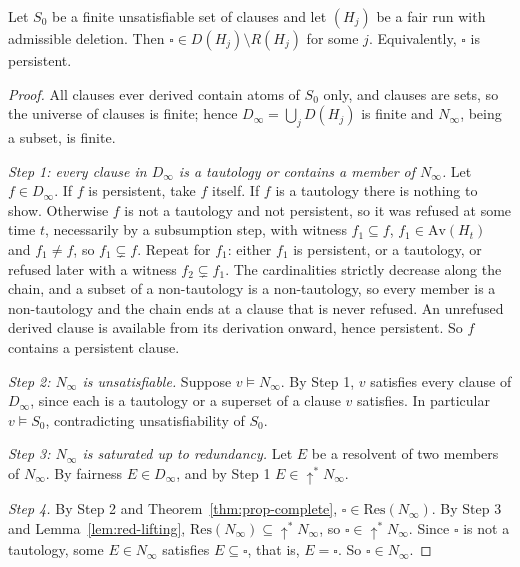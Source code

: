 \begin{theorem}
\label{thm:complete-deletion}
Let $S_0$ be a finite unsatisfiable set of clauses and let $(H_j)$ be a fair run with admissible deletion. Then $\square\in D(H_j)\setminus R(H_j)$ for some $j$. Equivalently, $\square$ is persistent.
\end{theorem}

\begin{proof}
All clauses ever derived contain atoms of $S_0$ only, and clauses are sets, so the universe of clauses is finite; hence $D_\infty=\bigcup_jD(H_j)$ is finite and $N_\infty$, being a subset, is finite.

\emph{Step 1: every clause in $D_\infty$ is a tautology or contains a member of $N_\infty$.} Let $f\in D_\infty$. If $f$ is persistent, take $f$ itself. If $f$ is a tautology there is nothing to show. Otherwise $f$ is not a tautology and not persistent, so it was refused at some time $t$, necessarily by a subsumption step, with witness $f_1\subseteq f$, $f_1\in\mathrm{Av}(H_t)$ and $f_1\ne f$, so $f_1\subsetneq f$. Repeat for $f_1$: either $f_1$ is persistent, or a tautology, or refused later with a witness $f_2\subsetneq f_1$. The cardinalities strictly decrease along the chain, and a subset of a non-tautology is a non-tautology, so every member is a non-tautology and the chain ends at a clause that is never refused. An unrefused derived clause is available from its derivation onward, hence persistent. So $f$ contains a persistent clause.

\emph{Step 2: $N_\infty$ is unsatisfiable.} Suppose $v\models N_\infty$. By Step 1, $v$ satisfies every clause of $D_\infty$, since each is a tautology or a superset of a clause $v$ satisfies. In particular $v\models S_0$, contradicting unsatisfiability of $S_0$.

\emph{Step 3: $N_\infty$ is saturated up to redundancy.} Let $E$ be a resolvent of two members of $N_\infty$. By fairness $E\in D_\infty$, and by Step 1 $E\in\uparrow^{\ast}\!N_\infty$.

\emph{Step 4.} By Step 2 and Theorem~\ref{thm:prop-complete}, $\square\in\mathrm{Res}(N_\infty)$. By Step 3 and Lemma~\ref{lem:red-lifting}, $\mathrm{Res}(N_\infty)\subseteq\uparrow^{\ast}\!N_\infty$, so $\square\in\uparrow^{\ast}\!N_\infty$. Since $\square$ is not a tautology, some $E\in N_\infty$ satisfies $E\subseteq\square$, that is, $E=\square$. So $\square\in N_\infty$.
\end{proof}

